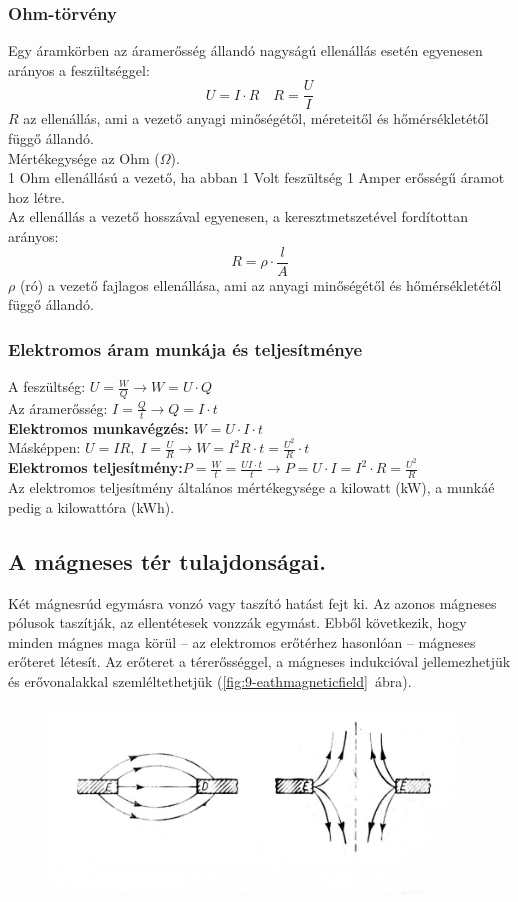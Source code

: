 \subsubsection{Ohm-törvény}
Egy áramkörben az áramerősség állandó nagyságú ellenállás esetén egyenesen arányos a feszültséggel:
$$U = I \cdot R \quad R = \frac{U}{I}$$
$R$ az ellenállás, ami a vezető anyagi minőségétől, méreteitől és hőmérsékletétől függő állandó.\\
Mértékegysége az Ohm ($\Omega$).\\
1 Ohm ellenállású a vezető, ha abban 1 Volt feszültség 1 Amper erősségű áramot hoz létre.\\
Az ellenállás a vezető hosszával egyenesen, a keresztmetszetével fordítottan arányos:
$$ R = \rho \cdot \frac{l}{A} $$
$\rho$ (ró) a vezető fajlagos ellenállása, ami az anyagi minőségétől és hőmérsékletétől függő állandó.

\subsubsection{Elektromos áram munkája és teljesítménye}
A feszültség: $U = \frac{W}{Q} \rightarrow W = U \cdot Q$\\
Az áramerősség: $I = \frac{Q}{t} \rightarrow Q = I \cdot t$\\
\textbf{Elektromos munkavégzés:} $W = U \cdot I \cdot t$\\
Másképpen: $U = IR,\;I=\frac{U}{R} \rightarrow W = I^2R\cdot t = \frac{U^2}{R} \cdot t$\\
\textbf{Elektromos teljesítmény:}$P=\frac{W}{t}=\frac{UI\cdot t}{t} \rightarrow P=U\cdot I = I^2\cdot R = \frac{U^2}{R}$\\
Az elektromos teljesítmény általános mértékegysége a kilowatt (kW), a munkáé pedig a kilowattóra (kWh).

\subsection{A mágneses tér tulajdonságai. }
Két mágnesrúd egymásra vonzó vagy taszító hatást fejt ki. Az azonos mágneses pólusok taszítják, az ellentétesek vonzzák egymást. Ebből következik, hogy minden mágnes maga körül -- az elektromos erőtérhez hasonlóan -- mágneses erőteret létesít. Az erőteret a térerősséggel, a mágneses indukcióval jellemezhetjük és erővonalakkal szemléltethetjük (\ref{fig:9-eathmagneticfield}~ábra).
\begin{figure}[h]
	\centering
	\includegraphics[width=0.7\linewidth]{fig/9-Magnetic_field}
	\caption{}
	\label{fig:9-magneticfield}
\end{figure}

